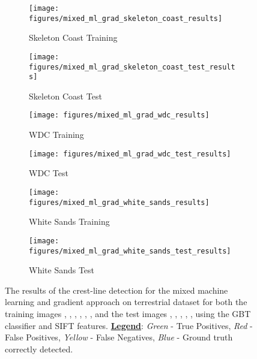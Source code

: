 \begin{figure}
	\ContinuedFloat
	\centering
	\begin{subfigure}{0.48\textwidth}
		\centering
		\texttt{[image: figures/mixed\_ml\_grad\_skeleton\_coast\_results]}
		\caption{ Skeleton Coast Training }
		\label{fig:mixed_ml_grad_skeleton_coast_results}
	\end{subfigure}
	\begin{subfigure}{0.48\textwidth}
		\centering
		\texttt{[image: figures/mixed\_ml\_grad\_skeleton\_coast\_test\_results]}
		\caption{ Skeleton Coast Test }
		\label{fig:mixed_ml_grad_skeleton_coast_test_results}
	\end{subfigure}
	\begin{subfigure}{0.48\textwidth}
		\centering
		\texttt{[image: figures/mixed\_ml\_grad\_wdc\_results]}
		\caption{ WDC Training }
		\label{fig:mixed_ml_grad_wdc_results}
	\end{subfigure}
	\begin{subfigure}{0.48\textwidth}
		\centering
		\texttt{[image: figures/mixed\_ml\_grad\_wdc\_test\_results]}
		\caption{ WDC Test }
		\label{fig:mixed_ml_grad_wdc_test_results}
	\end{subfigure}
	\begin{subfigure}{0.48\textwidth}
		\centering
		\texttt{[image: figures/mixed\_ml\_grad\_white\_sands\_results]}
		\caption{ White Sands Training }
		\label{fig:mixed_ml_grad_white_sands_results}
	\end{subfigure}
	\begin{subfigure}{0.48\textwidth}
		\centering
		\texttt{[image: figures/mixed\_ml\_grad\_white\_sands\_test\_results]}
		\caption{ White Sands Test }
		\label{fig:mixed_ml_grad_white_sands_test_results}
	\end{subfigure}
	\caption{ The results of the crest-line detection for the mixed machine learning and gradient approach on terrestrial dataset for both the training images , , , , , , and the test images , , , , ,  using the GBT classifier and SIFT features. \underline{\textbf{Legend}}: \emph{Green} - True Positives, \emph{Red} - False Positives, \emph{Yellow} - False Negatives, \emph{Blue} - Ground truth correctly detected. }
	\label{fig:mixed_ml_grad_results}
\end{figure}


